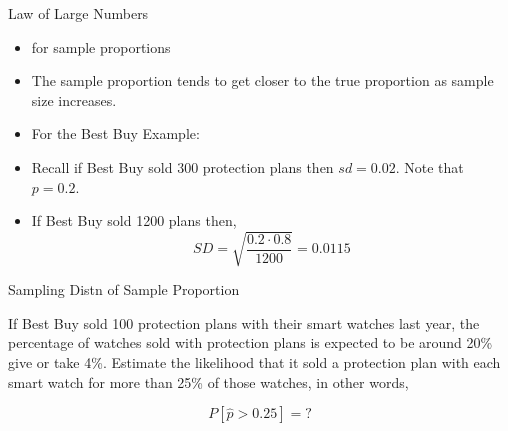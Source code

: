 \documentclass[14pt]{beamer}\usepackage[]{graphicx}\usepackage[]{color}
\begin{document}
\begin{frame}[fragile]{Law of Large Numbers}

\begin{itemize}
\item<1-> for sample proportions
\item<1-> The sample proportion tends to get closer to the true proportion as  sample size increases.

\item<2-> For the Best Buy Example:
\item<2-> Recall if Best Buy sold 300 protection plans then $sd = 0.02$. Note that  $p = 0.2$.

\item<3-> If Best Buy sold 1200 plans then,
\begin{equation*}
SD = \sqrt{ \frac{ 0.2 \cdot 0.8}{1200}} = 0.0115
\end{equation*}
\end{itemize}
\end{frame}

\begin{frame}[fragile]{Sampling Distn of Sample Proportion}

If Best Buy sold 100 protection plans with their smart watches last year, the percentage of watches sold with protection plans is expected to be around 20\% give or take 4\%.  Estimate the likelihood that it sold a protection plan with each smart watch  for more  than 25\% of those watches, in other words,

\begin{equation*}
  P[ \hat{p} > 0.25] = ?
\end{equation*}
\end{frame}
\end{document}
